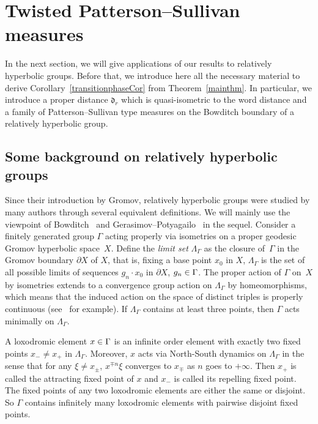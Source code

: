 \documentclass[AHL,Unicode,longabstracts]{cedram}
\newcommand{\fkd}{\mathfrak{d}}
\let\oldin\in
\renewcommand{\in}{\mathchoice{\oldin}{\oldin}{\,\oldin\,}{\,\oldin\,}}
\begin{document}
\section{Twisted Patterson--Sullivan measures}
\label{Sectionpattersonsullivan}

In the next section, we will give applications of our results to relatively hyperbolic groups. Before that, we introduce here all the necessary material to derive Corollary~\ref{transitionphaseCor} from Theorem~\ref{mainthm}. In particular, we introduce a proper distance $\fkd_r$ which is quasi-isometric to the word distance and a family of Patterson--Sullivan type measures on the Bowditch boundary of a relatively hyperbolic group.


\subsection{Some background on relatively hyperbolic groups}
\label{subsectiondefRHG}

Since their introduction by Gromov, relatively hyperbolic groups were studied by many authors through several equivalent definitions. We will mainly use the viewpoint of Bowditch~\cite{Bowditch} and Gerasimov--Potyagailo~\cite{GePoJEMS,GePoGGD,GP16} in the sequel. Consider a finitely generated group $\Gamma$ acting properly via isometries on a proper geodesic Gromov hyperbolic space~$X$. Define the \emph{limit set} $\Lambda_\Gamma$ as the closure of~$\Gamma$ in the Gromov boundary $\partial X$ of $X$, that is, fixing a base point $x_0$ in $X$, $\Lambda_\Gamma$ is the set of all possible limits of sequences $g_n\cdot x_0$ in $\partial X$, $g_n\in \Gamma$. The proper action of $\Gamma$ on~$X$ by isometries extends to a convergence group action on $\Lambda_\Gamma$ by homeomorphisms, which means that the induced action on the space of distinct triples is properly continuous (see~\cite[Proposition~1.11]{Bo99} for example). If $\Lambda_\Gamma$ contains at least three points, then $\Gamma$ acts minimally on $\Lambda_\Gamma$.

A loxodromic element $x\in \Gamma$ is an infinite order element with exactly two fixed points $x_-\ne x_+$ in $\Lambda_\Gamma$. Moreover, $x$ acts via North-South dynamics on $\Lambda_\Gamma$ in the sense that for any $\xi\neq x_{\pm}$, $x^{\mp n}\xi$ converges to $x_{\mp}$ as $n$ goes to $+\infty$. Then $x_+$ is called the attracting fixed point of $x$ and $x_-$ is called its repelling fixed point. The fixed points of any two loxodromic elements are either the same or disjoint. So $\Gamma$ contains infinitely many loxodromic elements with pairwise disjoint fixed points.
\end{document}
